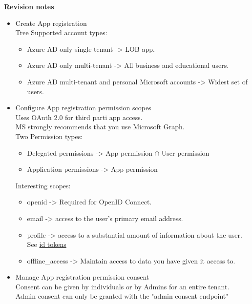 \textbf{Revision notes}
\begin{itemize}
\item Create App registration \\
Tree Supported account types:
	\begin{itemize}
	\item Azure AD only single-tenant -> LOB app.
	\item Azure AD only multi-tenant -> All business and educational users.
	\item Azure AD multi-tenant and personal Microsoft accounts -> Widest set of users.
	\end{itemize}
\item Configure App registration permission scopes \\
Uses OAuth 2.0 for third parti app access.\\
MS strongly recommends that you use Microsoft Graph. \\
Two Permission types:
	\begin{itemize}
	\item Delegated permissions -> App permission $\cap$ User permission 
	\item Application permissions -> App permission  
	\end{itemize}
Interesting scopes: 
	\begin{itemize}
	\item openid -> Required for OpenID Connect.
	\item email -> access to the user's primary email address.
	\item profile -> access to a substantial amount of information about the user. See \href{https://docs.microsoft.com/en-us/azure/active-directory/develop/id-tokens}{id tokens}
	\item offline\_access -> Maintain access to data you have given it access to.
	\end{itemize}
\item Manage App registration permission consent \\
Consent can be given by individuals or by Admins for an entire tenant. \\
Admin consent can only be granted with the "admin consent endpoint"
\end{itemize}

